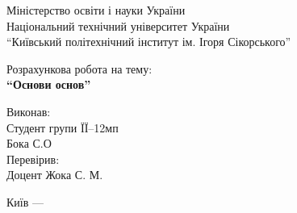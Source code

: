 \begin{titlepage}
        \large
        \centering

        Міністерство освіти і науки України \\
        Національний технічний університет України \\
        ``Київський політехнічний інститут ім. Ігоря Сікорського'' \\
        
        \vspace{6em}
        
        {\Large
            Розрахункова робота на тему: \\
            \textbf{``Основи основ''} \\
        }

        \vspace{8em}
        
        \hfill
        \begin{minipage}[t]{0.4\textwidth}
            Виконав: \\
            Студент групи ЇЇ--12мп \\
            Бока С.О \\
            Перевірив: \\
            Доцент Жока С. М. \\
        \end{minipage}

        \vfill
        
        Київ --- \the\year
\end{titlepage}